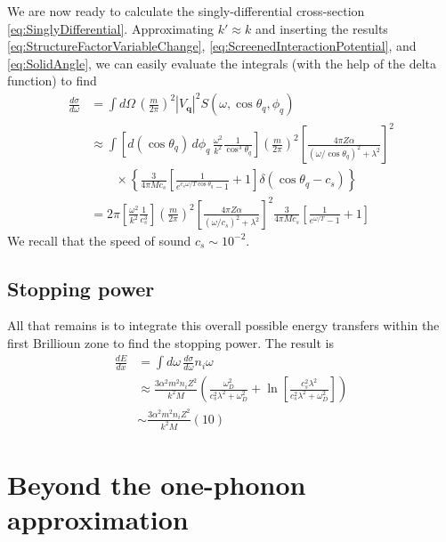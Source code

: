\documentclass{article}
\begin{document}
We are now ready to calculate the singly-differential cross-section \eqref{eq:SinglyDifferential}. Approximating $k' \approx k$ and inserting the results \eqref{eq:StructureFactorVariableChange}, \eqref{eq:ScreenedInteractionPotential}, and \eqref{eq:SolidAngle}, we can easily evaluate the integrals (with the help of the delta function) to find
\begin{align}
\frac{d \sigma}{d \omega} &= \int d \Omega\, \left( \frac{m}{2 \pi} \right)^2 |V_\textbf{q}|^2 S(\omega, \cos\theta_q, \phi_q) \\
 &\approx \int \left[ d(\cos\theta_q)\,d \phi_q\,\frac{\omega^2}{k^2}\frac{1}{\cos^3 \theta_q} \right] \left( \frac{m}{2 \pi} \right)^2 \left[ \frac{4 \pi Z\alpha}{(\omega / \cos\theta_q)^2+ \lambda^2} \right]^2 \\
 &\qquad \times\left\{ \frac{3}{4 \pi M c_s} \left[ \frac{1}{e^{c_s\omega / T\cos\theta_q} - 1} + 1 \right] \delta(\cos\theta_{q} - c_s) \right\} \nonumber \\
 &= 2 \pi \left[\frac{\omega^2}{k^2}\frac{1}{c_s^3} \right] \left( \frac{m}{2 \pi} \right)^2 \left[ \frac{4 \pi Z\alpha}{(\omega / c_s)^2+ \lambda^2} \right]^2 \frac{3}{4 \pi M c_s} \left[ \frac{1}{e^{\omega / T} - 1} + 1 \right]
\end{align}
We recall that the speed of sound $c_s \sim 10^{-2}$.

\subsection{Stopping power}

All that remains is to integrate this overall possible energy transfers within the first Brillioun zone to find the stopping power. The result is
\begin{align}
\frac{dE}{d x} &= \int d\omega\, \frac{d \sigma}{d \omega} n_i \omega \\
  &\approx \frac{3 \alpha^2 m^2 n_i Z^2}{k^2 M} \left( \frac{\omega_D^2}{c_s^2 \lambda^2 + \omega_D^2} + \ln \left[ \frac{c_s^2 \lambda^2}{c_s^2 \lambda^2 + \omega_D^2} \right]  \right) \\
  &\sim \frac{3 \alpha^2 m^2 n_i Z^2}{k^2 M} (10)
\end{align}

\section{Beyond the one-phonon approximation}
\end{document}
